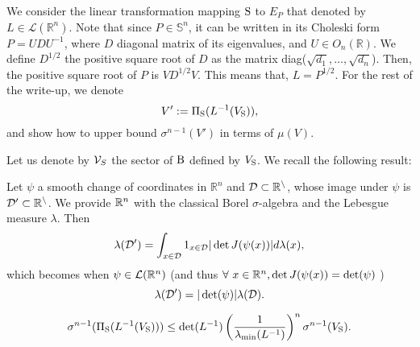 We consider the linear transformation mapping $\text{S}$ to $E_P$ that denoted by $L \in \mathcal{L}(\mathbb{R}^n)$. Note that since $P \in \mathbb{S}^n$, it can be written in its Choleski form $P = U D U^{-1}$, where 
$D$ diagonal matrix of its eigenvalues, and $U \in O_n(\mathbb{R})$. We define $D^{1/2}$ the positive square root of $D$ as the matrix diag($\sqrt{d_1},\dots, \sqrt{d_n}$). Then, the positive square root of $P$ is $V D^{1/2} V$. This means that, $L = P^{1/2}$. For the rest of the write-up, we denote $$V':=\Pi_{\text{S}}(L^{-1}(V_{\text{S}})),$$ and show how to upper bound $\sigma^{n-1}(V')$ in terms of $\mu(V)$.

Let us denote by $\mathcal{V}_S$ the sector of $\text{B}$ defined by $V_{\text{S}}$. We recall the following result:

\begin{lemma} 
Let $\psi$ a smooth change of coordinates in $\mathbb{R}^n$ and $\cal{D} \subset \mathbb{R}^n$, whose image under $\psi$ is $\cal{D}' \subset \mathbb{R}^n$. We provide $\mathbb{R}^n$ with the classical Borel $\sigma$-algebra and the Lebesgue measure $\lambda$. Then
\begin{equation}
\lambda(\mathcal{D}') = \int_{x \in \mathcal{D}} 1_{x \in \mathcal{D}} |\det J(\psi(x))| d\lambda(x),
\end{equation}
which becomes when $\psi \in \mathcal{L}(\mathbb{R}^n)$ (and thus $\forall\ x \in \mathbb{R}^n, \det J(\psi(x)) = \det(\psi)$ )
\begin{equation}
\lambda(\mathcal{D}') = |\det(\psi)| \lambda(\mathcal{D}).
\end{equation}
\end{lemma}


\begin{theorem} \label{lemma:lip}
\begin{equation}
\sigma^{n-1}(\Pi_{\text{S}}(L^{-1}(V_{\text{S}}))) \leq \det(L^{-1}) \left(\frac{1}{\lambda_{\min}(L^{-1})}\right)^n \sigma^{n-1}(V_{\text{S}}).
\end{equation}   
\end{theorem}

